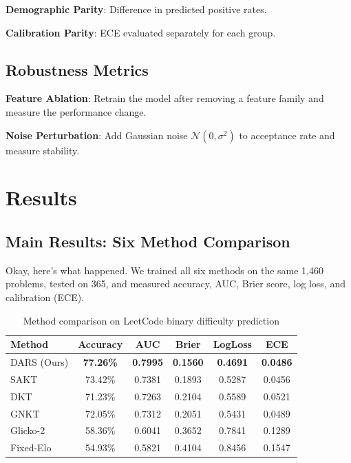 \documentclass[conference]{IEEEtran}
\begin{document}
\textbf{Demographic Parity}: Difference in predicted positive rates.

\textbf{Calibration Parity}: ECE evaluated separately for each group.

\subsection{Robustness Metrics}

\textbf{Feature Ablation}: Retrain the model after removing a feature family and measure the performance change.

\textbf{Noise Perturbation}: Add Gaussian noise $\mathcal{N}(0, \sigma^2)$ to acceptance rate and measure stability.

\section{Results}

\subsection{Main Results: Six Method Comparison}

Okay, here's what happened. We trained all six methods on the same 1,460 problems, tested on 365, and measured accuracy, AUC, Brier score, log loss, and calibration (ECE).

\begin{table}[h]
\centering
\small
\begin{tabular}{l|c|c|c|c|c}
\toprule
\textbf{Method} & \textbf{Accuracy} & \textbf{AUC} & \textbf{Brier} & \textbf{LogLoss} & \textbf{ECE} \\
\midrule
DARS (Ours) & \textbf{77.26\%} & \textbf{0.7995} & \textbf{0.1560} & \textbf{0.4691} & \textbf{0.0486} \\
SAKT & 73.42\% & 0.7381 & 0.1893 & 0.5287 & 0.0456 \\
DKT & 71.23\% & 0.7263 & 0.2104 & 0.5589 & 0.0521 \\
GNKT & 72.05\% & 0.7312 & 0.2051 & 0.5431 & 0.0489 \\
Glicko-2 & 58.36\% & 0.6041 & 0.3652 & 0.7841 & 0.1289 \\
Fixed-Elo & 54.93\% & 0.5821 & 0.4104 & 0.8456 & 0.1547 \\
\bottomrule
\end{tabular}
\caption{Method comparison on LeetCode binary difficulty prediction}
\label{tab:results}
\end{table}
\end{document}
